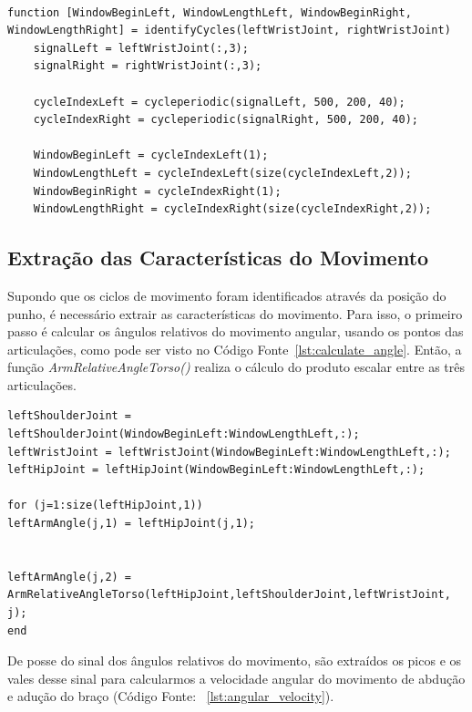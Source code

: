 \begin{lstlisting}[frame=single, caption=Identificar Início e Tamanho do Movimento Periódico, label=lst:identifyCycles]  % Start your code-block

function [WindowBeginLeft, WindowLengthLeft, WindowBeginRight, WindowLengthRight] = identifyCycles(leftWristJoint, rightWristJoint)
    signalLeft = leftWristJoint(:,3);
    signalRight = rightWristJoint(:,3);

    cycleIndexLeft = cycleperiodic(signalLeft, 500, 200, 40);
    cycleIndexRight = cycleperiodic(signalRight, 500, 200, 40);

    WindowBeginLeft = cycleIndexLeft(1);
    WindowLengthLeft = cycleIndexLeft(size(cycleIndexLeft,2));
    WindowBeginRight = cycleIndexRight(1);
    WindowLengthRight = cycleIndexRight(size(cycleIndexRight,2));
\end{lstlisting}

\subsection{Extração das Características do Movimento}
Supondo que os ciclos de movimento foram identificados através da posição do punho, é necessário extrair as características do movimento. Para isso, o primeiro passo é calcular os ângulos relativos do movimento angular, usando os pontos das articulações, como pode ser visto no Código Fonte~\ref{lst:calculate_angle}. Então, a função \textit{ArmRelativeAngleTorso()} realiza o cálculo do produto escalar entre as três articulações.

\begin{lstlisting}[frame=single, caption=Calcular ângulos relativos do movimento, label=lst:calculate_angle]
leftShoulderJoint = leftShoulderJoint(WindowBeginLeft:WindowLengthLeft,:);
leftWristJoint = leftWristJoint(WindowBeginLeft:WindowLengthLeft,:);  
leftHipJoint = leftHipJoint(WindowBeginLeft:WindowLengthLeft,:);  

for (j=1:size(leftHipJoint,1))
leftArmAngle(j,1) = leftHipJoint(j,1);
        

leftArmAngle(j,2) = ArmRelativeAngleTorso(leftHipJoint,leftShoulderJoint,leftWristJoint, j);    
end
\end{lstlisting}

De posse do sinal dos ângulos relativos do movimento, são extraídos os picos e os vales desse sinal para calcularmos a velocidade angular do movimento de abdução e adução do braço (Código Fonte: ~\ref{lst:angular_velocity}).
    
